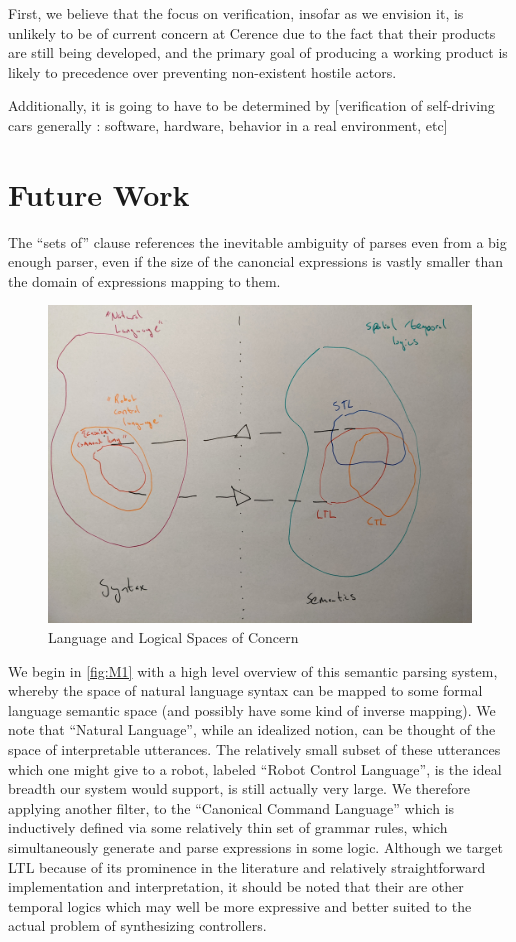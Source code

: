 \documentclass[a4paper, 11pt]{article}
\begin{document}
First, we believe that the focus on verification, insofar as we envision it, is
unlikely to be of current concern at Cerence due to the fact that their products
are still being developed, and the primary goal of producing a working product
is likely to precedence over preventing non-existent hostile actors.

Additionally, it is going to have to be determined by 
[verification of self-driving cars generally : software, hardware, behavior in
a real environment, etc]



\section{Future Work}

The ``sets of'' clause
references the inevitable ambiguity of parses even from a big enough parser, even
if the size of the canoncial expressions is vastly smaller than the domain of
expressions mapping to them.

\begin{figure}[H]
\centering
\includegraphics[width=150mm]{pics/one.jpg}
\caption{Language and Logical Spaces of Concern} \label{fig:M1}
\end{figure}

We begin in \autoref{fig:M1} with a high level overview of this semantic parsing
system, whereby the space of natural language syntax can be mapped to some
formal language semantic space (and possibly have some kind of inverse mapping).
We note that ``Natural Language'', while an idealized notion, can be thought of
the space of interpretable utterances. The relatively small subset of these
utterances which one might give to a robot, labeled ``Robot Control Language'',
is the ideal breadth our system would support, is still actually very large. We
therefore applying another filter, to the ``Canonical Command Language'' which
is inductively defined via some relatively thin set of grammar rules, which
simultaneously generate and parse expressions in some logic. Although we target
LTL because of its prominence in the literature and relatively straightforward
implementation and interpretation, it should be noted that their are other
temporal logics which may well be more expressive and better suited to the
actual problem of synthesizing controllers.
\end{document}
